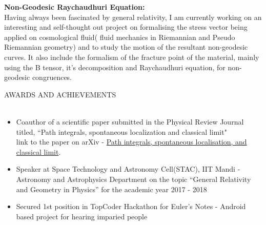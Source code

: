 \documentclass[a4paper]{article}
\newcommand{\lineunder} {
    \vspace*{-8pt} \\
    \hspace*{-18pt} \hrulefill \\
}
\newcommand{\header} [1] {
    {\hspace*{-18pt}\vspace*{6pt} \textsc{#1}}
    \vspace*{-6pt} \lineunder
}
\begin{document}
\textbf{Non-Geodesic Raychaudhuri Equation: }\\
Having always been fascinated by general relativity, I am currently working on an interesting and self-thought out project on formalising the stress vector being applied on cosmological fluid( fluid mechanics in Riemannian and Pseudo Riemannian geometry) and to study the motion of the resultant non-geodesic curves. It also include the formalism of the fracture point of the material, mainly using the B tensor, it’s decomposition and Raychaudhuri equation, for non-geodesic congruences. \\
\vspace{2mm}
\newpage

\header{AWARDS AND ACHIEVEMENTS}
\begin{itemize} \itemsep 1pt
    \item Coauthor of a scientific paper submitted in the Physical Review Journal titled, “Path integrals, spontaneous localization and classical limit"\\
    link to the paper on arXiv - \href{https://bit.ly/2AOwPsf}{Path integrals, spontaneous localisation, and classical limit}.
    \item Speaker at Space Technology and Astronomy Cell(STAC), IIT Mandi - Astronomy and Astrophysics Department on the topic “General Relativity and Geometry in Physics” for the academic year 2017 - 2018 \\
    \item Secured 1st position in TopCoder Hackathon for Euler’s Notes - Android based project for hearing imparied people \\
\end{itemize}
\vspace{2mm}
\end{document}
